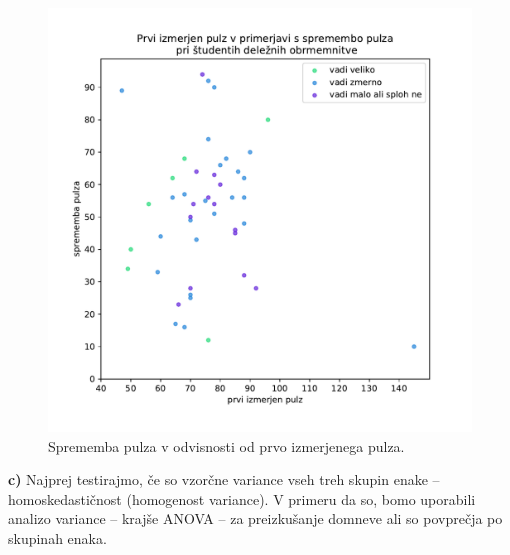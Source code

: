 \documentclass[a4paper,11pt]{article}
\begin{document}
\begin{figure}[h]
    \begin{center}
        \includegraphics[scale=0.65]{pulz_vadba.pdf}
        \caption{
            Sprememba pulza v odvisnosti od prvo izmerjenega pulza.
            }
        \label{Sprememba pulza v odvisnosti od prvo izmerjenega pulza}
    \end{center}
\end{figure}

\noindent
\textbf{c)} Najprej testirajmo, če so vzorčne variance vseh treh skupin enake -- homoskedastičnost (homogenost variance). V primeru da so, bomo uporabili analizo variance -- krajše ANOVA -- za preizkušanje domneve ali so povprečja po skupinah enaka. 
\newline
\end{document}
